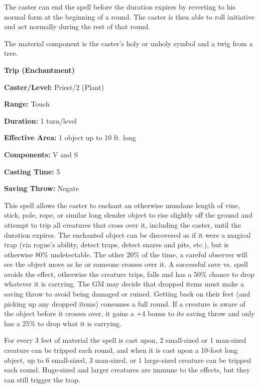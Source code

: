 \begin{multicols}{2}
The caster can end the spell before the duration expires by reverting to his normal form at the beginning of a round.  The caster is then able to roll initiative and act normally during the rest of that round.

The material component is the caster's holy or unholy symbol and a twig from a tree.

\vspace{1em}

\noindent
\begin{minipage}{\columnwidth}

\noindent \textbf{Trip (Enchantment)}

\noindent \textbf{Caster/Level:} Priest/2 (Plant)

\noindent \textbf{Range:} Touch

\noindent \textbf{Duration:} 1 turn/level

\noindent \textbf{Effective Area:} 1 object up to 10 ft. long

\noindent \textbf{Components:} V and S

\noindent \textbf{Casting Time:} 5

\noindent \textbf{Saving Throw:} Negate

\end{minipage}

This spell allows the caster to enchant an otherwise mundane length of vine, stick, pole, rope, or similar long slender object to rise slightly off the ground and attempt to trip all creatures that cross over it, including the caster, until the duration expires.  The enchanted object can be discovered as if it were a magical trap (via rogue's ability, detect traps, detect snares and pits, etc.), but is otherwise 80\% undetectable.  The other 20\% of the time, a careful observer will see the object move as he or someone crosses over it.  A successful save vs. spell avoids the effect, otherwise the creature trips, falls and has a 50\% chance to drop whatever it is carrying.  The GM may decide that dropped items must make a saving throw to avoid being damaged or ruined.  Getting back on their feet (and picking up any dropped items) consumes a full round.  If a creature is aware of the object before it crosses over, it gains a +4 bonus to its saving throw and only has a 25\% to drop what it is carrying.  

For every 3 feet of material the spell is cast upon, 2 small-sized or 1 man-sized creature can be tripped each round, and when it is cast upon a 10-foot long object, up to 6 small-sized, 3 man-sized, or 1 large-sized creature can be tripped each round.  Huge-sized and larger creatures are immune to the effects, but they can still trigger the trap.


\end{multicols}
